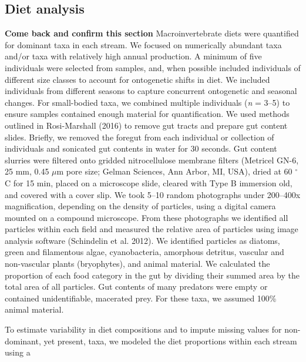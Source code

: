 \documentclass[
]{article}
\begin{document}
\hypertarget{diet-analysis}{%
\subsection{Diet analysis}\label{diet-analysis}}

\textbf{Come back and confirm this section} Macroinvertebrate diets were
quantified for dominant taxa in each stream. We focused on numerically
abundant taxa and/or taxa with relatively high annual production. A
minimum of five individuals were selected from samples, and, when
possible included individuals of different size classes to account for
ontogenetic shifts in diet. We included individuals from different
seasons to capture concurrent ontogenetic and seasonal changes. For
small-bodied taxa, we combined multiple individuals (\emph{n} = 3--5) to
ensure samples contained enough material for quantification. We used
methods outlined in Rosi-Marshall (2016) to remove gut tracts and
prepare gut content slides. Briefly, we removed the foregut from each
individual or collection of individuals and sonicated gut contents in
water for 30 seconds. Gut content slurries were filtered onto gridded
nitrocellulose membrane filters (Metricel GN-6, 25 mm, 0.45 \(\mu\)m
pore size; Gelman Sciences, Ann Arbor, MI, USA), dried at 60 \(^\circ\)C
for 15 min, placed on a microscope slide, cleared with Type B immersion
old, and covered with a cover slip. We took 5--10 random photographs
under 200--400x magnification, depending on the density of particles,
using a digital camera mounted on a compound microscope. From these
photographs we identified all particles within each field and measured
the relative area of particles using image analysis software (Schindelin
et al. 2012). We identified particles as diatoms, green and filamentous
algae, cyanobacteria, amorphous detritus, vascular and non-vascular
plants (bryophytes), and animal material. We calculated the proportion
of each food category in the gut by dividing their summed area by the
total area of all particles. Gut contents of many predators were empty
or contained unidentifiable, macerated prey. For these taxa, we assumed
100\% animal material.

To estimate variability in diet compositions and to impute missing
values for non-dominant, yet present, taxa, we modeled the diet
proportions within each stream using a
\end{document}
